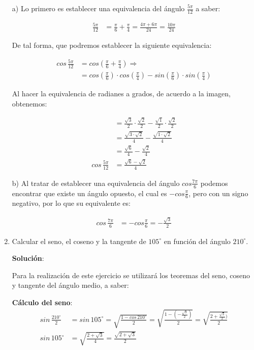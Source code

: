 \documentclass[11pt,letterpaper]{article}
\begin{document}
\begin{enumerate}
	a) Lo primero es establecer una equivalencia del ángulo $\frac{5\pi}{12}$ a saber:
	
	\begin{align*}
		\frac{5\pi}{12} &= \frac{\pi}{6} + \frac{\pi}{4} = \frac{4\pi + 6\pi}{24} = \frac{10\pi}{24} 
	\end{align*}

	De tal forma, que podremos establecer la siguiente equivalencia:
	
	\begin{align*}
		cos\,\frac{5\pi}{12} &= cos\left(\frac{\pi}{6} + \frac{\pi}{4}\right) \Rightarrow \\
		&= cos\left(\frac{\pi}{6}\right) \cdot cos\left(\frac{\pi}{4}\right) - sin\left(\frac{\pi}{6}\right) \cdot sin\left(\frac{\pi}{4}\right)
	\end{align*}

	Al hacer la equivalencia de radianes a grados, de acuerdo a la imagen, obtenemos:
	
	\begin{align*}
		&= \frac{\sqrt{3}}{2} \cdot \frac{\sqrt{2}}{2} - \frac{\sqrt{1}}{2} \cdot \frac{\sqrt{2}}{2}\\
		&= \frac{\sqrt{3 \cdot \sqrt{2}}}{4} - \frac{\sqrt{1 \cdot \sqrt{2}}}{4}\\
		&= \frac{\sqrt{6}}{4} - \frac{\sqrt{2}}{4}\\
		cos\,\frac{5\pi}{12} &= \frac{\sqrt{6} - \sqrt{2}}{4}
	\end{align*}

	b) Al tratar de establecer una equivalencia del ángulo $cos \frac{7\pi}{6}$ podemos encontrar que existe un ángulo opuesto, el cual es
	$- cos \frac{\pi}{6}$, pero con un signo negativo, por lo que su equivalente es:
	
	\begin{align*}
		cos\,\frac{7\pi}{6} &= - cos \frac{\pi}{6} = - \frac{\sqrt{3}}{2}
	\end{align*}

	\item Calcular el seno, el coseno y la tangente de $105^\circ$ en función del ángulo $210^\circ$. 

	\textbf{Solución}:

	Para la realización de este ejercicio se utilizará los teoremas del seno, coseno y tangente del ángulo medio, a saber:
	
	\textbf{Cálculo del seno}:
	\begin{align*}
		sin\,\frac{210^{\circ}}{2} &= sin\,105^{\circ} = \sqrt{\frac{1 - cos\,210^{\circ}}{2}} = \sqrt{\frac{1 - (-\frac{\sqrt{3}}{2})}{2}} = \sqrt{\frac{2  + \frac{\sqrt{3}}{2})}{2}}\\
		sin\,105^{\circ} &= \sqrt{\frac{2  + \sqrt{3}}{4}} = \frac{\sqrt{2 + \sqrt{3}}}{2}
	\end{align*}
		

\end{enumerate}
\end{document}
